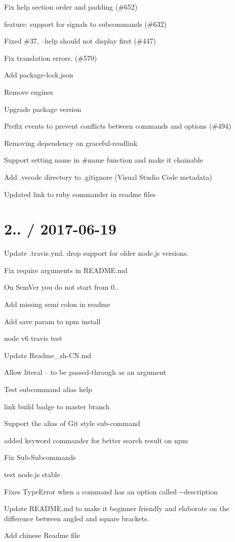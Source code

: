 \begin{DoxyItemize}
\item Fix help section order and padding (\#652)
\item feature\+: support for signals to subcommands (\#632)
\item Fixed \#37, --help should not display first (\#447)
\item Fix translation errors. (\#570)
\item Add package-\/lock.\+json
\item Remove engines
\item Upgrade package version
\item Prefix events to prevent conflicts between commands and options (\#494)
\item Removing dependency on graceful-\/readlink
\item Support setting name in \#name function and make it chainable
\item Add .vscode directory to .gitignore (Visual Studio Code metadata)
\item Updated link to ruby commander in readme files
\end{DoxyItemize}

\section*{2.. / 2017-\/06-\/19 }


\begin{DoxyItemize}
\item Update .travis.\+yml. drop support for older node.\+js versions.
\item Fix require arguments in R\+E\+A\+D\+M\+E.\+md
\item On Sem\+Ver you do not start from 0..
\item Add missing semi colon in readme
\item Add save param to npm install
\item node v6 travis test
\item Update Readme\+\_\+zh-\/\+C\+N.\+md
\item Allow literal \textquotesingle{}--\textquotesingle{} to be passed-\/through as an argument
\item Test subcommand alias help
\item link build badge to master branch
\item Support the alias of Git style sub-\/command
\item added keyword commander for better search result on npm
\item Fix Sub-\/\+Subcommands
\item test node.\+js stable
\item Fixes Type\+Error when a command has an option called {\ttfamily -\/-\/description}
\item Update R\+E\+A\+D\+M\+E.\+md to make it beginner friendly and elaborate on the difference between angled and square brackets.
\item Add chinese Readme file
\end{DoxyItemize}

